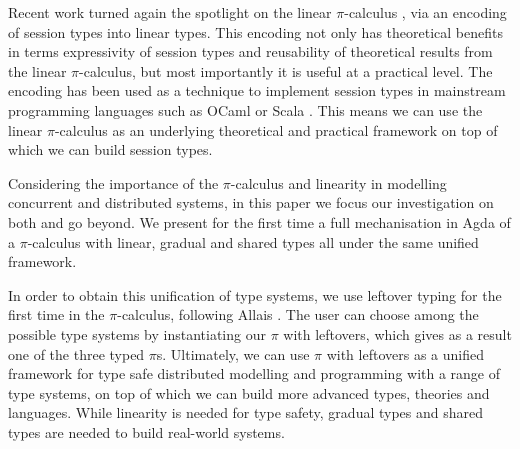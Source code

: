 \documentclass[a4paper,UKenglish,cleveref, autoref, thm-restate,authorcolumns]{lipics-v2019}
\theoremstyle{definition}
\newcommand{\picalc}{$\pi$-calculus}
\begin{document}
Recent work \cite{DardhaGS12,Dardha14,DardhaGS17} turned again the spotlight on the linear \picalc{} \cite{KPT96}, via an encoding of session types into linear types.
This encoding not only has theoretical benefits in terms expressivity of session types and reusability of theoretical results from the linear \picalc{}, but most importantly it is useful at a practical level.
The encoding has been used as a technique to implement session types in mainstream programming languages such as OCaml \cite{Padovani17} or Scala \cite{ScalasY16,ScalasDHY17}.
This means we can use the linear \picalc{} as an underlying theoretical and practical framework on top of which we can build session types.

Considering the importance of the \picalc{} and linearity in modelling concurrent and distributed systems, in this paper we focus our investigation on both and go beyond.
We present for the first time a full mechanisation in Agda of a \picalc{} with linear, gradual and shared types all under the same unified framework.

In order to obtain this unification of type systems, we use leftover typing for the first time in the \picalc{}, following Allais \cite{Allais2018a}.
The user can choose among the possible type systems by instantiating our $\pi$ with leftovers, which gives as a result one of the three typed $\pi$s.
Ultimately, we can use $\pi$ with leftovers as a unified framework for type safe distributed modelling and programming with a range of type systems, on top of which we can build more advanced types, theories and languages.
While linearity is needed for type safety, gradual types and shared types are needed to build real-world systems.
\end{document}
